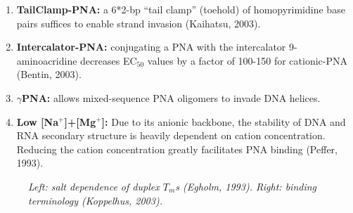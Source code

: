 \documentclass[a4paper,12pt]{article}
\begin{document}
\begin{enumerate}
\item {\bf TailClamp-PNA:} a 6*2-bp ``tail clamp'' (toehold) of homopyrimidine base pairs suffices to enable strand invasion (Kaihatsu, 2003).
\item {\bf Intercalator-PNA:} conjugating a PNA with the intercalator 9-aminoacridine decreases EC$_{50}$ values by a factor of 100-150 for cationic-PNA (Bentin, 2003).
\item {\bf $\gamma$PNA:} allows mixed-sequence PNA oligomers to invade DNA helices.
\item {\bf Low [Na$^+$]+[Mg$^+$]:} Due to its anionic backbone, the stability of DNA and RNA secondary structure is heavily dependent on cation concentration. Reducing the cation concentration greatly facilitates PNA binding (Peffer, 1993).
\end{enumerate}
\begin{figure}[H]
	\caption{\it Left: salt dependence of duplex $T_m$s (Egholm, 1993). Right: binding terminology (Koppelhus, 2003).}
	\label{invasionmodes}
\end{figure}
\end{document}
